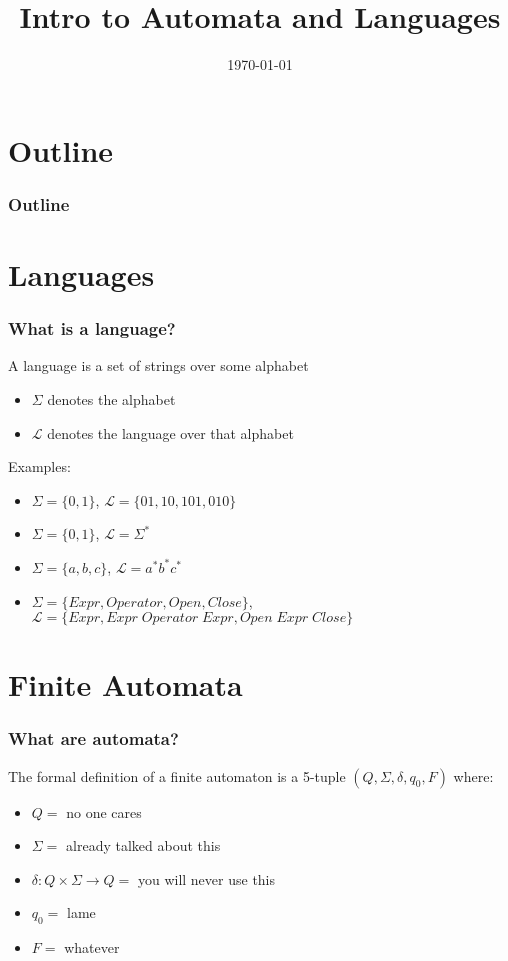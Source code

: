\documentclass{beamer}
\title{Intro to Automata and Languages}
\institute[Recurse Center]{An hour-long explanation of Dave's ``well actually"}
\date{\today}
\begin{document}
\begin{frame}
	\titlepage
\end{frame}

\section*{Outline}
\begin{frame}
	\frametitle{Outline}
	\tableofcontents

\end{frame}

\section*{Languages}
\begin{frame}
	\frametitle{What is a language?}
	A language is a set of strings over some alphabet
	\begin{itemize}
		\item $\Sigma $ denotes the alphabet
		\item $\mathcal{L}$ denotes the language over that alphabet	
	\end{itemize}
	
	\vspace{0.3in}
	Examples:\\
	\begin{itemize}
	\item $\Sigma = \{0, 1\}$, $\mathcal{L} = \{ 01, 10, 101, 010 \}$\\
	\item $\Sigma = \{0, 1\}$, $\mathcal{L} = \Sigma ^{*}$ \\
	\item $\Sigma = \{a, b, c\}$, $\mathcal{L} = a^* b^* c^* $ \\
	\item $\Sigma = \{Expr, Operator, Open, Close\}$, $\mathcal{L} = \{Expr, Expr\; Operator\; Expr, Open\; Expr\; Close \}$
	\end{itemize}
\end{frame}

\section*{Finite Automata}
\begin{frame}
	\frametitle{What are automata?}
	The formal definition of a finite automaton is a 5-tuple 
	$(Q, \Sigma, \delta, q_0, F)$ where:
	
	\begin{itemize}
	\item $Q = $ no one cares
	\item $\Sigma = $ already talked about this
	\item $\delta: Q \times \Sigma \rightarrow Q  = $ you will never use this 
	\item $q_0 = $  lame
	\item $F = $ whatever
	\end{itemize}
	
\end{frame}
\end{document}
